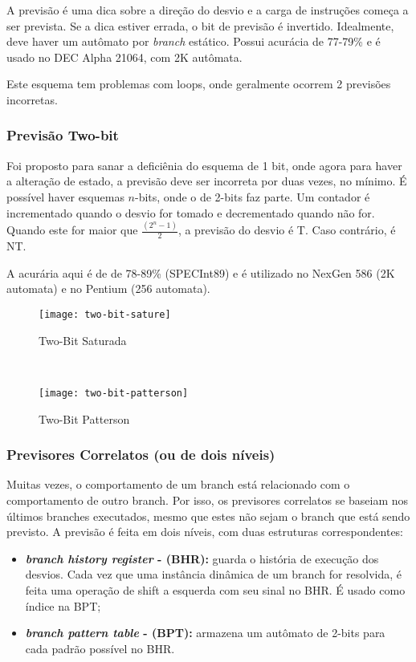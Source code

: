 A previsão é uma dica sobre a direção do desvio e a carga de instruções começa a ser prevista. Se a dica estiver errada, o bit de previsão é invertido. Idealmente, deve haver um autômato por \textit{branch} estático. Possui acurácia de 77-79\% e é usado no DEC Alpha 21064, com 2K autômata.

Este esquema tem problemas com loops, onde geralmente ocorrem 2 previsões incorretas.




\subsubsection{Previsão Two-bit}

Foi proposto para sanar a deficiênia do esquema de 1 bit, onde agora para haver a alteração de estado, a previsão deve ser incorreta por duas vezes, no mínimo. É possível haver esquemas $n$-bits, onde o de 2-bits faz parte. Um contador é incrementado quando o desvio for tomado e decrementado quando não for. Quando este for maior que $\frac{(2^n - 1)}{2}$, a previsão do desvio é T. Caso contrário, é NT.

A acurária aqui é de de 78-89\% (SPECInt89) e é utilizado no NexGen 586 (2K automata) e no Pentium (256 automata).

\begin{figure*}
  \begin{subfigure}{.5\textwidth}
    \centering
    \texttt{[image: two-bit-sature]}
    \caption{Two-Bit Saturada}
    \label{fig:two-bit-sature}
  \end{subfigure}
  ~
  \begin{subfigure}{.5\textwidth}
    \centering
    \texttt{[image: two-bit-patterson]}
    \caption{Two-Bit Patterson}
    \label{fig:two-bit-patterson}
  \end{subfigure}
\end{figure*}




\subsubsection{Previsores Correlatos (ou de dois níveis)}

Muitas vezes, o comportamento de um branch está relacionado com o comportamento de outro branch. Por isso, os previsores correlatos se baseiam nos últimos branches executados, mesmo que estes não sejam o branch que está sendo previsto. A previsão é feita em dois níveis, com duas estruturas correspondentes:
\begin{itemize}
  \item \textbf{\textit{branch history register} - (BHR):} guarda o história de execução dos desvios. Cada vez que uma instância dinâmica de um branch for resolvida, é feita uma operação de shift a esquerda com seu sinal no BHR. É usado como índice na BPT;

  \item \textbf{\textit{branch pattern table} - (BPT):} armazena um autômato de 2-bits para cada padrão possível no BHR.
\end{itemize}

